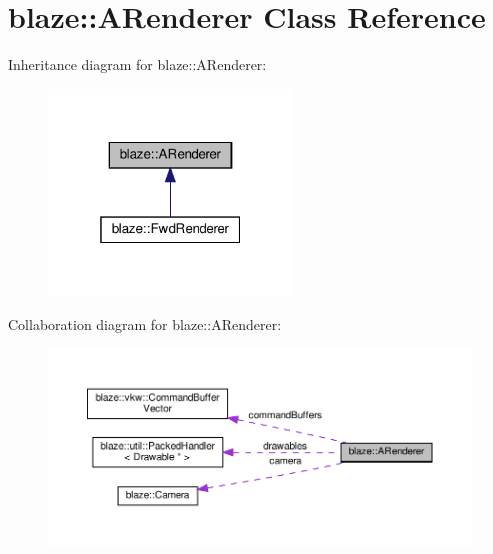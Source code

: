 \hypertarget{classblaze_1_1ARenderer}{}\section{blaze\+:\+:A\+Renderer Class Reference}
\label{classblaze_1_1ARenderer}


Inheritance diagram for blaze\+:\+:A\+Renderer\+:\nopagebreak
\begin{figure}[H]
\begin{center}
\leavevmode
\includegraphics[width=184pt]{classblaze_1_1ARenderer__inherit__graph}
\end{center}
\end{figure}


Collaboration diagram for blaze\+:\+:A\+Renderer\+:\nopagebreak
\begin{figure}[H]
\begin{center}
\leavevmode
\includegraphics[width=350pt]{classblaze_1_1ARenderer__coll__graph}
\end{center}
\end{figure}

